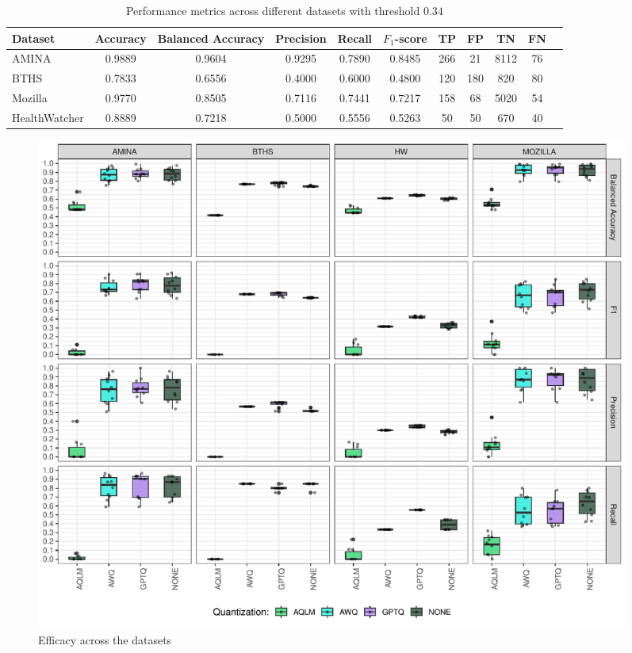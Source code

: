 \documentclass[conference]{IEEEtran}
\begin{document}
\begin{table}[h!]
    \centering
    \caption{Performance metrics across different datasets with threshold $0.34$}
    \begin{tabular}{lcccccccccc}
    \toprule
    Dataset & Accuracy & Balanced Accuracy & Precision & Recall & $F_1$-score & TP & FP & TN & FN \\
    \midrule
    AMINA & 0.9889 & 0.9604 & 0.9295 & 0.7890 & 0.8485 & 266 & 21  & 8112 & 76  \\
    BTHS & 0.7833 & 0.6556 & 0.4000 & 0.6000 & 0.4800 & 120 & 180 & 820  & 80  \\
    Mozilla & 0.9770 & 0.8505 & 0.7116 & 0.7441 & 0.7217 & 158 & 68  & 5020 & 54  \\
    HealthWatcher & 0.8889 & 0.7218 & 0.5000 & 0.5556 & 0.5263 & 50  & 50  & 670  & 40  \\
    \bottomrule
    \end{tabular}
    \label{tab:dataset_performance}
\end{table}

\newpage
{}

\begin{figure}[ht]
    \centering
    \includegraphics[width=0.95\textwidth]{images/RQ1_box_plot.pdf}
    \caption{Efficacy across the datasets}
    \label{fig:RQ1_boxplot_full}
\end{figure}
\end{document}
